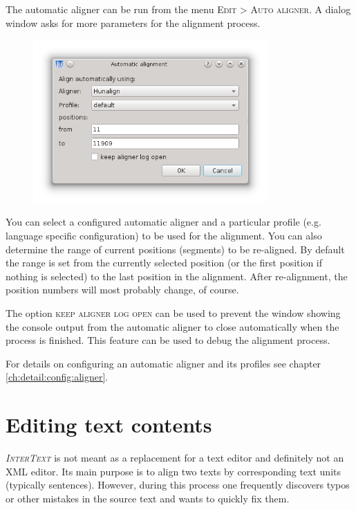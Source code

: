 \documentclass[a4paper,10pt,oneside]{book}
\newcommand{\IT}{\textit{\textsc{InterText}}\xspace}
\newcommand{\menu}[1]{\textsc{#1}}
\begin{document}
The automatic aligner can be run from the menu \menu{Edit} > \menu{Auto aligner}. A dialog window asks for more parameters for the alignment process.


\begin{figure}[htb]
 \includegraphics[width=0.8\textwidth]{screenshots/autoaligner.png}
\end{figure}

You can select a configured automatic aligner and a particular profile (e.g. language specific configuration) to be used for the alignment. You can also determine the range of current positions (segments) to be re-aligned. By default the range is set from the currently selected position (or the first position if nothing is selected) to the last position in the alignment. After re-alignment, the position numbers will most probably change, of course.

The option \menu{keep aligner log open} can be used to prevent the window showing the console output from the automatic aligner to close automatically when the process is finished. This feature can be used to debug the alignment process.

For details on configuring an automatic aligner and its profiles see chapter \ref{ch:detail:config:aligner}.


\section{Editing text contents}\label{ch:howto:edit_text}

\IT is not meant as a replacement for a text editor and definitely not an XML editor. Its main purpose is to align two texts by corresponding text units (typically sentences). However, during this process one frequently discovers typos or other mistakes in the source text and wants to quickly fix them.
\end{document}
